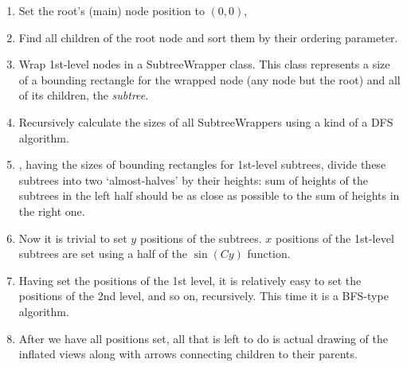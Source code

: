 \begin{enumerate}
	\item Set the root's (main) node position to $(0,0)$,
	\item Find all children of the root node and sort them by their ordering parameter.
	\item Wrap 1st-level nodes in a SubtreeWrapper class. This class represents a size of a bounding rectangle for the wrapped node (any node but the root) and all of its children, the \emph{subtree}.
	\item Recursively calculate the sizes of all SubtreeWrappers using a kind of a DFS algorithm.
	\item, having the sizes of bounding rectangles for 1st-level subtrees, divide these subtrees into two `almost-halves' by their heights: sum of heights of the subtrees in the left half should be as close as possible to the sum of heights in the right one.
	\item Now it is trivial to set $y$ positions of the subtrees. $x$ positions of the 1st-level subtrees are set using a half of the $\sin(Cy)$ function.
	\item Having set the positions of the 1st level, it is relatively easy to set the positions of the 2nd level, and so on, recursively. This time it is a BFS-type algorithm.
	\item After we have all positions set, all that is left to do is actual drawing of the inflated  views along with arrows connecting children to their parents.
	\end{enumerate}
